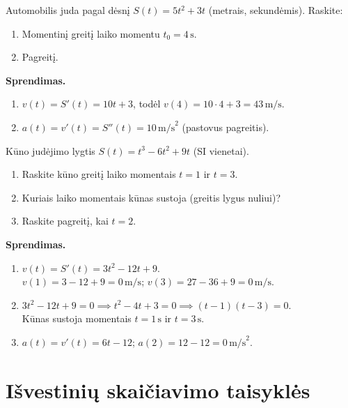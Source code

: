 \begin{example}
Automobilis juda pagal dėsnį $S(t) = 5t^2 + 3t$ (metrais, sekundėmis). Raskite:
\begin{enumerate}[label=\alph*)]
    \item Momentinį greitį laiko momentu $t_0 = 4\,\text{s}$.
    \item Pagreitį.
\end{enumerate}

\textbf{Sprendimas.}
\begin{enumerate}[label=\alph*)]
    \item $v(t) = S'(t) = 10t + 3$, todėl $v(4) = 10 \cdot 4 + 3 = 43\,\text{m/s}$.
    \item $a(t) = v'(t) = S''(t) = 10\,\text{m/s}^2$ (pastovus pagreitis).
\end{enumerate}
\end{example}

\begin{exercise}
Kūno judėjimo lygtis $S(t) = t^3 - 6t^2 + 9t$ (SI vienetai).
\begin{enumerate}[label=\alph*)]
    \item Raskite kūno greitį laiko momentais $t = 1$ ir $t = 3$.
    \item Kuriais laiko momentais kūnas sustoja (greitis lygus nuliui)?
    \item Raskite pagreitį, kai $t = 2$.
\end{enumerate}

\textbf{Sprendimas.}
\begin{enumerate}[label=\alph*)]
    \item $v(t) = S'(t) = 3t^2 - 12t + 9$.\\
          $v(1) = 3 - 12 + 9 = 0\,\text{m/s}$; \quad $v(3) = 27 - 36 + 9 = 0\,\text{m/s}$.
    \item $3t^2 - 12t + 9 = 0 \implies t^2 - 4t + 3 = 0 \implies (t-1)(t-3) = 0$.\\
          Kūnas sustoja momentais $t = 1\,\text{s}$ ir $t = 3\,\text{s}$.
    \item $a(t) = v'(t) = 6t - 12$; \quad $a(2) = 12 - 12 = 0\,\text{m/s}^2$.
\end{enumerate}
\end{exercise}


\section{Išvestinių skaičiavimo taisyklės}

